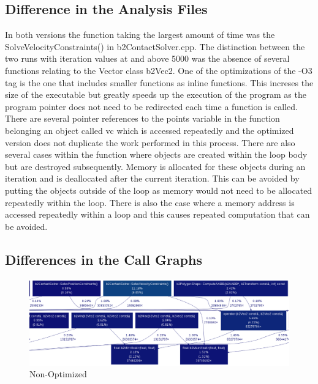 \documentclass[11pt] {article}
\begin{document}
\subsection{Difference in the Analysis Files}

In both versions the function taking the largest amount of time was the SolveVelocityConstraints() in
b2ContactSolver.cpp. The distinction between the two runs with iteration values at and above 5000 was
the absence of several functions relating to the Vector class b2Vec2. One of the optimizations of 
the -O3 tag is the one that includes smaller functions as inline functions. This increses the size of
the executable but greatly speeds up the execution of the program as the program pointer does not need
to be redirected each time a function is called. There are several pointer references to the points 
variable in the function belonging an object called vc which is accessed repeatedly and the
optimized version does not duplicate the work performed in this process. There are also several cases
within the function where objects are created within the loop body but are destroyed subsequently.
Memory is allocated for these objects during an iteration and is deallocated after the current 
iteration. This can be avoided by putting the objects outside of the loop as memory would not need
to be allocated repeatedly within the loop. There is also the case where a memory address is accessed
repeatedly within a loop and this causes repeated computation that can be avoided.

\subsection{Differences in the Call Graphs}

\begin {figure} [ht]
\begin {center}
\includegraphics[scale = 0.4] {debugProfile.eps}
\end {center}
\caption {Non-Optimized}
\end {figure}
\end{document}
